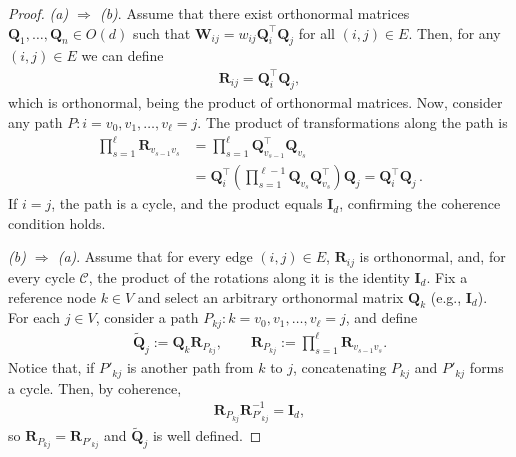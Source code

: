 \documentclass[10pt,a4paper]{amsart}
\begin{document}
\begin{proof}
\textit{(a) $\Rightarrow$ (b)}. Assume that there exist orthonormal matrices $\mathbf{Q}_1,\dots,\mathbf{Q}_n\in O(d)$ such that $\mathbf{W}_{ij} = w_{ij}\mathbf{Q}_i^\top \mathbf{Q}_j$ for all $(i,j)\in E$. Then, for any $(i,j)\in E$ we can define
\begin{align}
\label{eq:defQtQ}
    \mathbf{R}_{ij}=\mathbf{Q}_i^\top \mathbf{Q}_j,
\end{align}
which is orthonormal, being the product of orthonormal matrices. Now, consider any path $P:i=v_0,v_1,\dots,v_\ell=j$. The product of transformations along the path is
\begin{align}
    \prod_{s=1}^\ell \mathbf{R}_{v_{s-1}v_s} 
    &= \prod_{s=1}^\ell \mathbf{Q}_{v_{s-1}}^\top \mathbf{Q}_{v_s}\nonumber\\
    &= \mathbf{Q}_i^\top \left(\prod_{s=1}^{\ell-1} \mathbf{Q}_{v_s}\mathbf{Q}_{v_s}^\top\right)\mathbf{Q}_j
    = \mathbf{Q}_i^\top \mathbf{Q}_j\, .
\end{align}
If $i=j$, the path is a cycle, and the product equals $\mathbf{I}_d$, confirming the coherence condition holds.

\medskip
\textit{(b) $\Rightarrow$ (a)}.  
Assume that for every edge $(i,j)\in E$, $\mathbf{R}_{ij}$ is orthonormal, and, for every cycle $\mathcal C$, the product of the rotations along it is the identity $\mathbf{I}_d$.  
Fix a reference node $k\in V$ and select an arbitrary orthonormal matrix $\mathbf{Q}_k$ (e.g., $\mathbf{I}_d$).  
For each $j\in V$, consider a path $P_{kj}:k=v_0,v_1,\dots,v_\ell=j$, and define
\begin{align}
    \widetilde{\mathbf{Q}}_j := \mathbf{Q}_k \mathbf{R}_{P_{kj}}, \qquad 
    \mathbf{R}_{P_{kj}} := \prod_{s=1}^\ell \mathbf{R}_{v_{s-1}v_s}.
\end{align}
Notice that, if ${P'_{kj}}$ is another path from $k$ to $j$, concatenating ${P_{kj}}$ and ${P'_{kj}}$ forms a cycle. Then, by coherence,
\begin{align}
    \mathbf{R}_{P_{kj}} \mathbf{R}_{{P'_{kj}}}^{-1} = \mathbf{I}_d,
\end{align}
so $\mathbf{R}_{P_{kj}}=\mathbf{R}_{{P'_{kj}}}$ and $\widetilde{\mathbf{Q}}_j$ is well defined.  


\end{proof}
\end{document}
